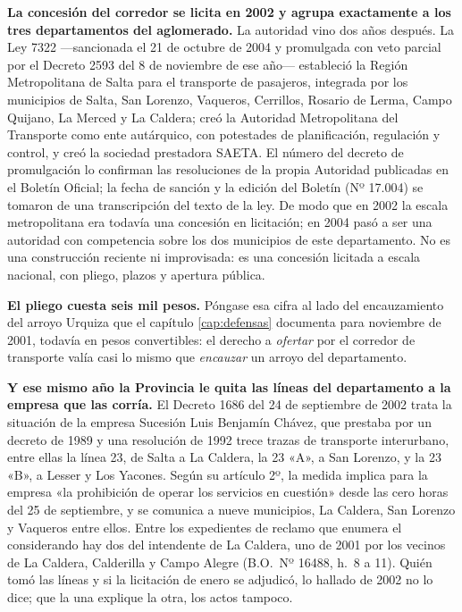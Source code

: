 \textbf{La concesión del corredor se licita en 2002 y agrupa exactamente a los tres departamentos del aglomerado.} La autoridad vino dos años después. La Ley 7322 ---sancionada el 21 de octubre de 2004 y promulgada con veto parcial por el Decreto 2593 del 8 de noviembre de ese año--- estableció la Región Metropolitana de Salta para el transporte de pasajeros, integrada por los municipios de Salta, San Lorenzo, Vaqueros, Cerrillos, Rosario de Lerma, Campo Quijano, La Merced y La Caldera; creó la Autoridad Metropolitana del Transporte como ente autárquico, con potestades de planificación, regulación y control, y creó la sociedad prestadora SAETA. El número del decreto de promulgación lo confirman las resoluciones de la propia Autoridad publicadas en el Boletín Oficial; la fecha de sanción y la edición del Boletín (Nº 17.004) se tomaron de una transcripción del texto de la ley. De modo que en 2002 la escala metropolitana era todavía una concesión en licitación; en 2004 pasó a ser una autoridad con competencia sobre los dos municipios de este departamento. No es una construcción reciente ni improvisada: es una concesión licitada a
escala nacional, con pliego, plazos y apertura pública.

\textbf{El pliego cuesta seis mil pesos.} Póngase esa cifra al lado del encauzamiento del arroyo Urquiza que el capítulo \ref{cap:defensas} documenta para noviembre de 2001, todavía en pesos convertibles: el derecho a \textit{ofertar} por el corredor de transporte valía casi lo mismo que \textit{encauzar} un arroyo del departamento.

\textbf{Y ese mismo año la Provincia le quita las líneas del departamento a la empresa que las corría.} El Decreto 1686 del 24 de septiembre de 2002 trata la situación de la empresa Sucesión Luis Benjamín Chávez, que prestaba por un decreto de 1989 y una resolución de 1992 trece trazas de transporte interurbano, entre ellas la línea 23, de Salta a La Caldera, la 23 «A», a San Lorenzo, y la 23 «B», a Lesser y Los Yacones. Según su artículo 2º, la medida implica para la empresa «la prohibición de operar los servicios en cuestión» desde las cero horas del 25 de septiembre, y se comunica a nueve municipios, La Caldera, San Lorenzo y Vaqueros entre ellos. Entre los expedientes de reclamo que enumera el considerando hay dos del intendente de La Caldera, uno de 2001 por los vecinos de La Caldera, Calderilla y Campo Alegre (B.O.\ Nº 16488, h.\ 8 a 11). Quién tomó las líneas y si la licitación de enero se adjudicó, lo hallado de 2002 no lo dice; que la una explique la otra, los actos tampoco.



